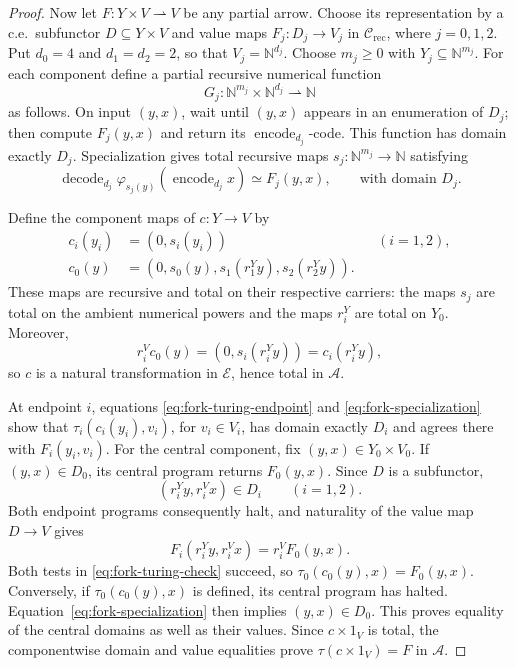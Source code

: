 \documentclass[11pt]{article}
\newcommand{\N}{\mathbb N}
\begin{document}
\begin{proof}
Now let $F:Y\times V\rightharpoonup V$ be any partial arrow.
Choose its representation by a c.e.\ subfunctor
$D\subseteq Y\times V$ and value maps
$F_j:D_j\to V_j$ in $\mathcal C_{\mathrm{rec}}$, where $j=0,1,2$.
Put $d_0=4$ and $d_1=d_2=2$, so that $V_j=\N^{d_j}$.
Choose $m_j\geq0$ with $Y_j\subseteq\N^{m_j}$.
For each component define a partial recursive numerical function
\[
 G_j:\N^{m_j}\times\N^{d_j}\rightharpoonup\N
\]
as follows. On input $(y,x)$, wait until $(y,x)$ appears in an
enumeration of $D_j$; then compute $F_j(y,x)$ and return its
$\operatorname{encode}_{d_j}$-code. This function has domain
exactly $D_j$.
Specialization gives total recursive maps
$s_j:\N^{m_j}\to\N$ satisfying
\begin{equation}\label{eq:fork-specialization}
 \operatorname{decode}_{d_j}
   \varphi_{s_j(y)}(\operatorname{encode}_{d_j}x)
 \simeq F_j(y,x),
 \qquad\text{with domain }D_j.
\end{equation}

Define the component maps of $c:Y\to V$ by
\begin{align*}
 c_i(y_i)&=(0,s_i(y_i)) &&(i=1,2),\\
 c_0(y)&=(0,s_0(y),s_1(r_1^Yy),s_2(r_2^Yy)).
\end{align*}
These maps are recursive and total on their respective carriers:
the maps $s_j$ are total on the ambient numerical powers and the
maps $r_i^Y$ are total on $Y_0$. Moreover,
\[
 r_i^Vc_0(y)=(0,s_i(r_i^Yy))=c_i(r_i^Yy),
\]
so $c$ is a natural transformation in $\mathcal E$, hence total in
$\mathcal A$.

At endpoint $i$, equations
\eqref{eq:fork-turing-endpoint} and
\eqref{eq:fork-specialization} show that
$\tau_i(c_i(y_i),v_i)$, for $v_i\in V_i$, has domain exactly
$D_i$ and agrees there with $F_i(y_i,v_i)$.
For the central component, fix $(y,x)\in Y_0\times V_0$.
If $(y,x)\in D_0$, its central program returns $F_0(y,x)$.
Since $D$ is a subfunctor,
\[
 (r_i^Yy,r_i^Vx)\in D_i\qquad(i=1,2).
\]
Both endpoint programs consequently halt, and naturality of
the value map $D\to V$ gives
\[
 F_i(r_i^Yy,r_i^Vx)=r_i^VF_0(y,x).
\]
Both tests in \eqref{eq:fork-turing-check} succeed, so
$\tau_0(c_0(y),x)=F_0(y,x)$.
Conversely, if $\tau_0(c_0(y),x)$ is defined, its central
program has halted. Equation~\eqref{eq:fork-specialization}
then implies $(y,x)\in D_0$.
This proves equality of the central domains as well as their
values. Since $c\times1_V$ is total, the componentwise domain
and value equalities prove $\tau(c\times1_V)=F$ in $\mathcal A$.
\end{proof}
\end{document}
